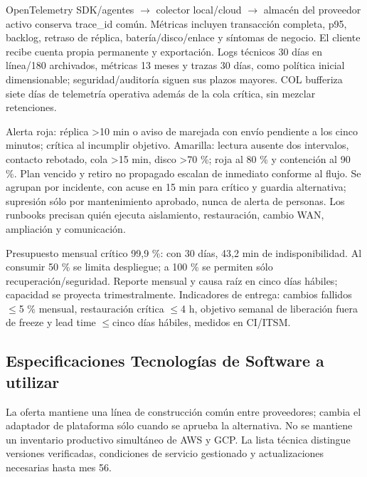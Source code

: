 \documentclass[11pt,letterpaper]{report}
\begin{document}
OpenTelemetry SDK/agentes $\rightarrow$ colector local/cloud $\rightarrow$ almacén del proveedor activo conserva trace\_id común. Métricas incluyen transacción completa, p95, backlog, retraso de réplica, batería/disco/enlace y síntomas de negocio. El cliente recibe cuenta propia permanente y exportación. Logs técnicos 30 días en línea/180 archivados, métricas 13 meses y trazas 30 días, como política inicial dimensionable; seguridad/auditoría siguen sus plazos mayores. COL bufferiza siete días de telemetría operativa además de la cola crítica, sin mezclar retenciones.

Alerta roja: réplica >10 min o aviso de marejada con envío pendiente a los cinco minutos; crítica al incumplir objetivo. Amarilla: lectura ausente dos intervalos, contacto rebotado, cola >15 min, disco >70 \%; roja al 80 \% y contención al 90 \%. Plan vencido y retiro no propagado escalan de inmediato conforme al flujo. Se agrupan por incidente, con acuse en 15 min para crítico y guardia alternativa; supresión sólo por mantenimiento aprobado, nunca de alerta de personas. Los runbooks precisan quién ejecuta aislamiento, restauración, cambio WAN, ampliación y comunicación.

Presupuesto mensual crítico 99,9 \%: con 30 días, 43,2 min de indisponibilidad. Al consumir 50 \% se limita despliegue; a 100 \% se permiten sólo recuperación/seguridad. Reporte mensual y causa raíz en cinco días hábiles; capacidad se proyecta trimestralmente. Indicadores de entrega: cambios fallidos $\leq$5 \% mensual, restauración crítica $\leq$4 h, objetivo semanal de liberación fuera de freeze y lead time $\leq$cinco días hábiles, medidos en CI/ITSM.

\subsection{Especificaciones Tecnologías de Software a utilizar}
La oferta mantiene una línea de construcción común entre proveedores; cambia el adaptador de plataforma sólo cuando se aprueba la alternativa. No se mantiene un inventario productivo simultáneo de AWS y GCP. La lista técnica distingue versiones verificadas, condiciones de servicio gestionado y actualizaciones necesarias hasta mes 56.
\end{document}
